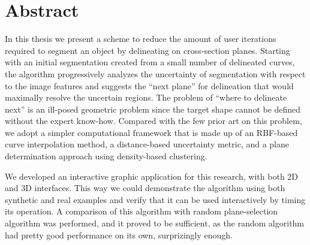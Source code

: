 
\section*{Abstract}
\label{sec:abstract}

\hypersetup{pageanchor=false}

In this thesis we present a scheme to reduce the amount of user iterations required to segment an object by delineating on cross-section planes.
Starting with an initial segmentation created from a small number of delineated curves, the algorithm progressively analyzes the uncertainty of segmentation with respect to the image features and suggests the ``next plane'' for delineation that would maximally resolve the uncertain regions.
The problem of ``where to delineate next'' is an ill-posed geometric problem since the target shape cannot be defined without the expert know-how. Compared with the few prior art on this problem, we adopt a simpler computational framework that is made up of an RBF-based curve interpolation method, a distance-based uncertainty metric, and a plane determination approach using density-based clustering.

We developed an interactive graphic application for this research, with both 2D and 3D interfaces.
This way we could demonstrate the algorithm using both synthetic and real examples and verify that it can be used interactively by timing its operation.
A comparison of this algorithm with random plane-selection algorithm was performed, and it proved to be sufficient, as the random algorithm had pretty good performance on its own, surprizingly enough.

